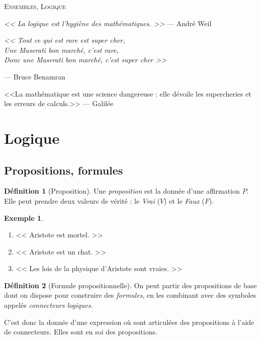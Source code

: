 \documentclass[11pt]{article}
\theoremstyle{definition}
\newtheorem{defn}{Définition}[section]
\newtheorem{exe}{Exemple}
\theoremstyle{remark}
\begin{document}
\begin{center}
	\textsc{\LARGE Ensembles, Logique}
\end{center}
\vspace{1cm}

\begin{flushright}
\textit{<< La logique est l'hygiène des mathématiques. >>} — André Weil\end{flushright}

\begin{flushright}
\begin{flushleft}
\textit{<< Tout ce qui est rare est super cher,\\
    Une Maserati bon marché, c'est rare,\\
    Donc une Maserati bon marché, c'est super cher >>}
\end{flushleft}
— Bruce Benamran
\end{flushright}

\begin{flushright}
<<La mathématique est une science dangereuse : elle dévoile les supercheries et les erreurs de calculs.>> — Galilée
\end{flushright}


\tableofcontents

\section{Logique}

\subsection{Propositions, formules}

\begin{defn}[Proposition]
Une \textit{proposition} est la donnée d'une affirmation $P$. Elle peut prendre deux valeurs de vérité : le \textit{Vrai} ($V$) et le \textit{Faux} ($F$).
\end{defn}

\begin{exe}\leavevmode
\begin{enumerate}
\item << Aristote est mortel. >>
\item << Aristote est un chat. >>
\item << Les lois de la physique d'Aristote sont vraies. >>
\end{enumerate}
\end{exe}

\begin{defn}[Formule propositionnelle]
On peut partir des propositions de base dont on dispose pour construire des \textit{formules}, en les combinant avec des symboles appelés \textit{connecteurs logiques}.

C'est donc la donnée d'une expression où sont articulées des propositions à l'aide de connecteurs. Elles sont en soi des propositions.
\end{defn}
\end{document}
